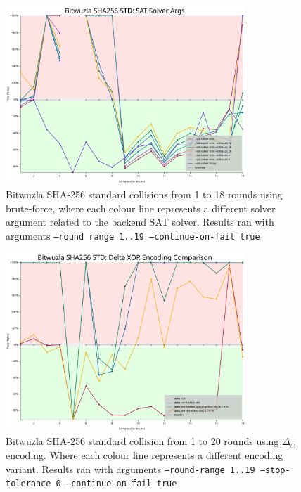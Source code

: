 \documentclass[a4paper]{report}
\begin{document}
\begin{figure}[H]
	\centering
	\includegraphics[width=0.8\textwidth]{../../graphs/bitwuzla_sat_solver_args.svg}
	\caption{Bitwuzla SHA-256 standard collisions from 1 to 18 rounds using brute-force, where each colour line represents a different solver argument related to the backend SAT solver.
	Results ran with arguments \texttt{--round range 1..19 --continue-on-fail true}}
	\label{fig:bitwuzla_sat_solver}
\end{figure}

\begin{figure}[H]
	\centering
	\includegraphics[width=0.8\textwidth]{../../graphs/bitwuzla_delta_xor_encoding_comparison.svg}
	\caption{Bitwuzla SHA-256 standard collision from 1 to 20 rounds using $\Delta_\oplus$ encoding. Where each colour line represents a different encoding variant.
	Results ran with arguments \texttt{--round-range 1..19 --stop-tolerance 0 --continue-on-fail true}}
	\label{fig:delta_xor}
\end{figure}
\end{document}
